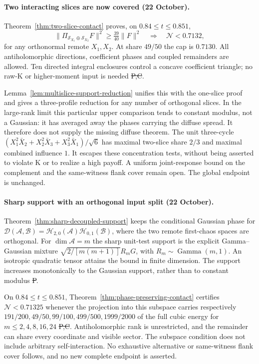 \paragraph{Two interacting slices are now covered (22 October).}
Theorem~\ref{thm:two-slice-contact} proves, on $0.84\le t\le0.851$,
\[
 \|\Pi_{\mathcal S_{X_1}\oplus\mathcal S_{X_2}}F\|^2
       \ge\tfrac{39}{40}\|F\|^2
 \quad\Longrightarrow\quad \mathcal N<0.7132,
\]
for any orthonormal remote $X_1,X_2$. At share $49/50$ the cap is
$0.7130$. All antiholomorphic directions, coefficient phases and
coupled remainders are allowed. Ten directed integral enclosures
control a concave coefficient triangle; no raw-K or higher-moment
input is needed \st{P,C}.

Lemma~\ref{lem:multislice-support-reduction} unifies this with the
one-slice proof and gives a three-profile reduction for any number of
orthogonal slices. In the large-rank limit this particular upper
comparison tends to constant modulus, not a Gaussian: it has averaged
away the phases carrying the diffuse spread. It therefore does not
supply the missing diffuse theorem.
The unit three-cycle
$(X_1^2\bar X_2+X_2^2\bar X_3+X_3^2\bar X_1)/\sqrt6$
has maximal two-slice share $2/3$ and maximal combined influence $1$.
It escapes these concentration tests, without being asserted to violate
K or to realize a high payoff. A uniform joint-response bound on the
complement and the same-witness flank cover remain open. The global
endpoint is unchanged.

\paragraph{Sharp support with an orthogonal input split (22 October).}
Theorem~\ref{thm:sharp-decoupled-support} keeps the conditional Gaussian
phase for $\mathcal D(\mathcal A,\mathcal B)
=\mathcal H_{2,0}(\mathcal A)\mathcal H_{0,1}(\mathcal B)$,
where the two remote first-chaos spaces are orthogonal. For
$\dim\mathcal A=m$ the sharp unit-test support is the explicit
Gamma--Gaussian mixture
$\sqrt{2/[m(m+1)]}R_mG$, with $R_m\sim\operatorname{Gamma}(m,1)$.
An isotropic quadratic tensor attains the bound in finite dimension.
The support increases monotonically to the Gaussian support, rather
than to constant modulus \st{P}.

On $0.84\le t\le0.851$, Theorem~\ref{thm:phase-preserving-contact}
certifies $\mathcal N<0.71325$ whenever the projection into this
subspace carries respectively
$191/200,49/50,99/100,499/500,1999/2000$ of the full cubic energy
for $m\le2,4,8,16,24$ \st{P,C}. Antiholomorphic rank is unrestricted,
and the remainder can share every coordinate and visible sector.
The subspace condition does not include arbitrary self-interaction.
No exhaustive alternative or same-witness flank cover follows, and
no new complete endpoint is asserted.

